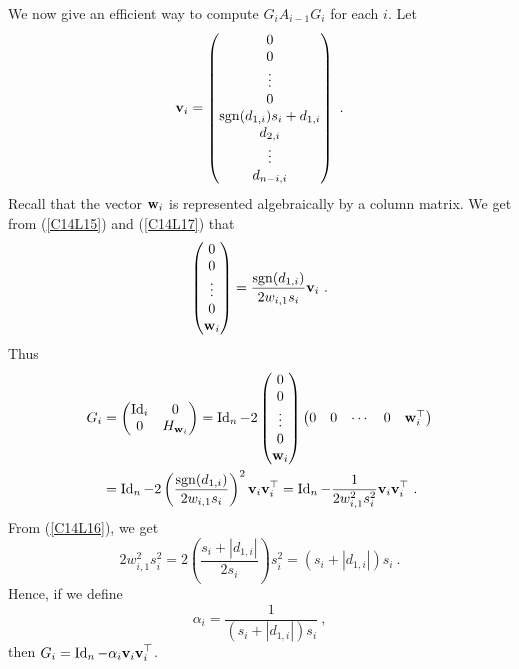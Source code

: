 We now give an efficient way to compute $G_i A_{i-1} G_i$ for each $i$.  Let
\begin{equation} \label{C14L19}
\mathbf{v}_i =
\begin{pmatrix}
0 \\ 0 \\ \vdots \\ 0 \\ \operatorname{sgn}(d_{1,i}) s_i + d_{1,i} \\
d_{2,i} \\ \vdots \\ d_{n-i,i}
\end{pmatrix} \ .
\end{equation}
Recall that the vector $\mathbf{w}_i$ is represented algebraically by a
 column matrix.  We get from (\ref{C14L15}) and
(\ref{C14L17}) that
\[
\begin{pmatrix}
0 \\ 0 \\ \vdots \\ 0 \\ \VEC{w}_i
\end{pmatrix} = \frac{\sgn(d_{1,i})}{2 w_{i,1} s_i} \VEC{v}_i \ .
\]
Thus
\begin{align*}
G_i &=
\begin{pmatrix}
\operatorname{Id}_{i} & 0 \\
0 & H_{\mathbf{w}_i}
\end{pmatrix}
= \operatorname{Id}_n - 2 \begin{pmatrix}
0 \\ 0 \\ \vdots \\ 0 \\ \mathbf{w}_i
\end{pmatrix} \begin{pmatrix}
0 & 0 & \cdots & 0 & \mathbf{w}_i^\top
\end{pmatrix} \\
&= \operatorname{Id}_n - 2 \left(\frac{\operatorname{sgn}(d_{1,i})}{2 w_{i,1} s_i}\right)^2 \mathbf{v}_i
\mathbf{v}_i^\top
= \operatorname{Id}_n - \frac{1}{2 w_{i,1}^2 s_i^2} \mathbf{v}_i \mathbf{v}_i^\top \  .
\end{align*}
From (\ref{C14L16}), we get
\[
2 w_{i,1}^2 s_i^2 = 2 \left(\frac{s_i + \left|d_{1,i}\right|}{2s_i}\right)
s_i^2 = \left( s_i + \left| d_{1,i}\right| \right)s_i \ .
\]
Hence, if we define
\begin{equation} \label{C14L20}
\alpha_i = \frac{1}{\left( s_i + \left| d_{1,i}\right| \right)s_i} \  ,
\end{equation}
then $\displaystyle G_i = \operatorname{Id}_n - \alpha_i \mathbf{v}_i \mathbf{v}_i^\top$.
